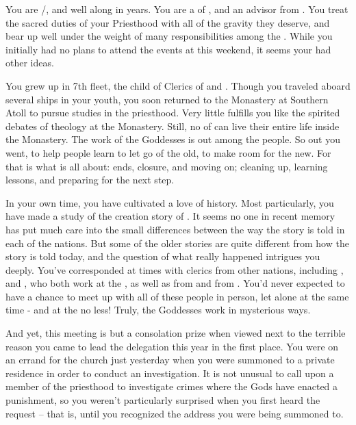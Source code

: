 \documentclass[char]{GL2020}
\begin{document}
\name{\cEbbPriest{}}

You are \cEbbPriest{\full} {\cEbbPriest{\they}/\cEbbPriest{\them}}, and well along in years. You are a \cEbbPriest{\cleric} of \cEbb{\full}, and an advisor from \pShip{}. You treat the sacred duties of your Priesthood with all of the gravity they deserve, and bear up well under the weight of many responsibilities among the \pShippies{}. While you initially had no plans to attend the events at \pSchool{} this weekend, it seems your \cEbb{\God} had other ideas.

You grew up in 7th fleet, the child of Clerics of \cEbb{} and \cFlow{}. Though you traveled aboard several ships in your youth, you soon returned to the Monastery at Southern Atoll to pursue studies in the priesthood. Very little fulfills you like the spirited debates of theology at the Monastery. Still, no \cEbbPriest{\cleric} of \cEbb{} can live their entire life inside the Monastery. The work of the Goddesses is out among the people. So out you went, to help people learn to let go of the old, to make room for the new. For that is what \cEbb{} is all about: ends, closure, and moving on; cleaning up, learning lessons, and preparing for the next step.

In your own time, you have cultivated a love of history. Most particularly, you have made a study of the creation story of \pEarth{}. It seems no one in recent memory has put much care into the small differences between the way the story is told in each of the nations. But some of the older stories are quite different from how the story is told today, and the question of what really happened intrigues you deeply. You’ve corresponded at times with clerics from other nations, including \cBeetle{}, and \cFlowPriest{}, who both work at the \pSchool{}, as well as \cAntiChup{} from \pTech{} and \cHedonist{} from \pFarm{}. You’d never expected to have a chance to meet up with all of these people in person, let alone at the same time - and at the \pSchool{} no less! Truly, the Goddesses work in mysterious ways.

And yet, this meeting is but a consolation prize when viewed next to the terrible reason you came to lead the \pShip{} delegation this year in the first place. You were on an errand for the church just yesterday when you were summoned to a private residence in order to conduct an investigation. It is not unusual to call upon a member of the priesthood to investigate crimes where the Gods have enacted a punishment, so you weren’t particularly surprised when you first heard the request -- that is, until you recognized the address you were being summoned to.
\end{document}
